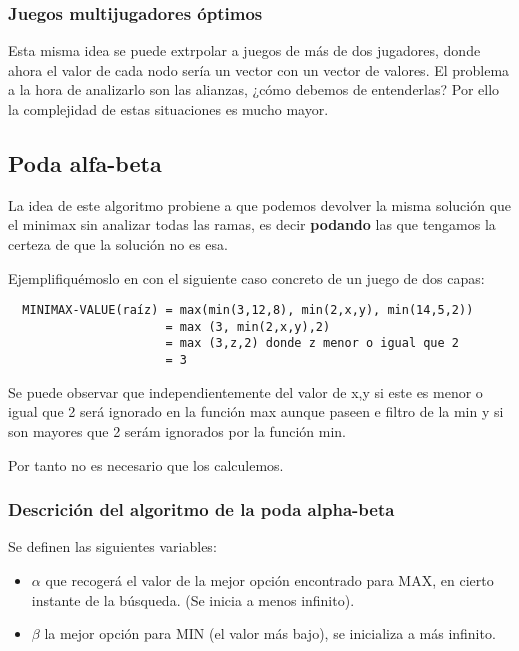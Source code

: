 \documentclass[12 pt, a4paper]{article}
\begin{document}
\subsubsection*{Juegos multijugadores óptimos}  
Esta misma idea se puede extrpolar a juegos de más de dos jugadores, donde ahora el valor de cada nodo sería un vector con un vector de valores. 
El problema a la hora de analizarlo son las alianzas, ¿cómo debemos de entenderlas? Por ello la complejidad de estas situaciones es mucho mayor. 

\subsection{Poda alfa-beta}

La idea de este algoritmo probiene a que podemos devolver la misma solución que el minimax sin analizar todas las ramas,
es decir \textbf{podando} las que tengamos la certeza de que la solución no es esa. 

Ejemplifiquémoslo en con el siguiente caso concreto de un juego de dos capas: 

\begin{verbatim}
  MINIMAX-VALUE(raíz) = max(min(3,12,8), min(2,x,y), min(14,5,2))
                      = max (3, min(2,x,y),2)
                      = max (3,z,2) donde z menor o igual que 2
                      = 3
\end{verbatim}

Se puede observar que independientemente del valor de x,y si este es menor o igual que 2 será ignorado en la función max aunque paseen e filtro de la min y si 
son mayores que 2 serám ignorados por la función min. 

Por tanto no es necesario que los calculemos. 

\subsubsection*{Descrición del algoritmo de la poda alpha-beta}

Se definen las siguientes variables: 

\begin{itemize}
  \item $\alpha$ que recogerá el valor de la mejor opción encontrado para MAX, en cierto instante de la búsqueda. (Se inicia a menos infinito).
  \item $\beta$ la mejor opción para MIN (el valor más bajo), se inicializa  a más infinito. 
\end{itemize}
\end{document}
